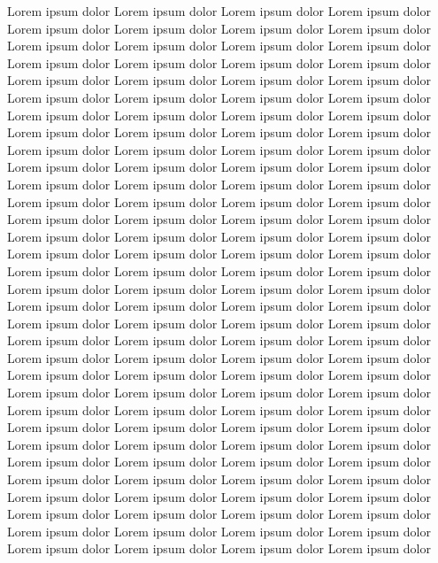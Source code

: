 Lorem ipsum dolor
Lorem ipsum dolor
Lorem ipsum dolor
Lorem ipsum dolor
Lorem ipsum dolor
Lorem ipsum dolor
Lorem ipsum dolor
Lorem ipsum dolor
Lorem ipsum dolor
Lorem ipsum dolor
Lorem ipsum dolor
Lorem ipsum dolor
Lorem ipsum dolor
Lorem ipsum dolor
Lorem ipsum dolor
Lorem ipsum dolor
Lorem ipsum dolor
Lorem ipsum dolor
Lorem ipsum dolor
Lorem ipsum dolor
Lorem ipsum dolor
Lorem ipsum dolor
Lorem ipsum dolor
Lorem ipsum dolor
Lorem ipsum dolor
Lorem ipsum dolor
Lorem ipsum dolor
Lorem ipsum dolor
Lorem ipsum dolor
Lorem ipsum dolor
Lorem ipsum dolor
Lorem ipsum dolor
Lorem ipsum dolor
Lorem ipsum dolor
Lorem ipsum dolor
Lorem ipsum dolor
Lorem ipsum dolor
Lorem ipsum dolor
Lorem ipsum dolor
Lorem ipsum dolor
Lorem ipsum dolor
Lorem ipsum dolor
Lorem ipsum dolor
Lorem ipsum dolor
Lorem ipsum dolor
Lorem ipsum dolor
Lorem ipsum dolor
Lorem ipsum dolor
Lorem ipsum dolor
Lorem ipsum dolor
Lorem ipsum dolor
Lorem ipsum dolor
Lorem ipsum dolor
Lorem ipsum dolor
Lorem ipsum dolor
Lorem ipsum dolor
Lorem ipsum dolor
Lorem ipsum dolor
Lorem ipsum dolor
Lorem ipsum dolor
Lorem ipsum dolor
Lorem ipsum dolor
Lorem ipsum dolor
Lorem ipsum dolor
Lorem ipsum dolor
Lorem ipsum dolor
Lorem ipsum dolor
Lorem ipsum dolor
Lorem ipsum dolor
Lorem ipsum dolor
Lorem ipsum dolor
Lorem ipsum dolor
Lorem ipsum dolor
Lorem ipsum dolor
Lorem ipsum dolor
Lorem ipsum dolor
Lorem ipsum dolor
Lorem ipsum dolor
Lorem ipsum dolor
Lorem ipsum dolor
Lorem ipsum dolor
Lorem ipsum dolor
Lorem ipsum dolor
Lorem ipsum dolor
Lorem ipsum dolor
Lorem ipsum dolor
Lorem ipsum dolor
Lorem ipsum dolor
Lorem ipsum dolor
Lorem ipsum dolor
Lorem ipsum dolor
Lorem ipsum dolor
Lorem ipsum dolor
Lorem ipsum dolor
Lorem ipsum dolor
Lorem ipsum dolor
Lorem ipsum dolor
Lorem ipsum dolor
Lorem ipsum dolor
Lorem ipsum dolor
Lorem ipsum dolor
Lorem ipsum dolor
Lorem ipsum dolor
Lorem ipsum dolor
Lorem ipsum dolor
Lorem ipsum dolor
Lorem ipsum dolor
Lorem ipsum dolor
Lorem ipsum dolor
Lorem ipsum dolor
Lorem ipsum dolor
Lorem ipsum dolor
Lorem ipsum dolor
Lorem ipsum dolor
Lorem ipsum dolor
Lorem ipsum dolor
Lorem ipsum dolor
Lorem ipsum dolor
Lorem ipsum dolor
Lorem ipsum dolor
Lorem ipsum dolor
Lorem ipsum dolor
Lorem ipsum dolor
Lorem ipsum dolor
Lorem ipsum dolor
Lorem ipsum dolor
Lorem ipsum dolor
Lorem ipsum dolor
